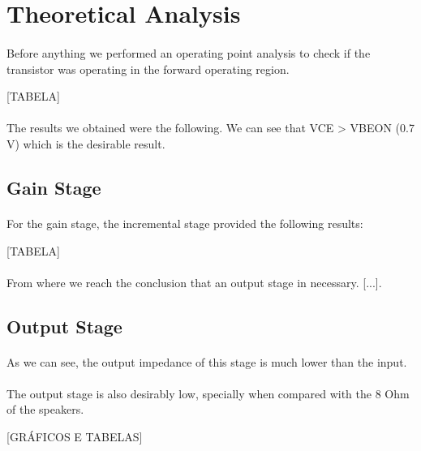 \section{Theoretical Analysis}
\label{sec:analysis}

\paragraph{} Before anything we performed an operating point analysis to check if the transistor was operating in the forward operating region.

[TABELA]

\paragraph{} The results we obtained were the following. We can see that VCE > VBEON (0.7 V) which is the desirable result.

\subsection{Gain Stage}

\paragraph{} For the gain stage, the incremental stage provided the following results:

[TABELA]

\paragraph{} From where we reach the conclusion that an output stage in necessary. [...].

\subsection{Output Stage}

\paragraph{} As we can see, the output impedance of this stage is much lower than the input.

\paragraph{} The output stage is also desirably low, specially when compared with the 8 Ohm of the speakers.

[GRÁFICOS E TABELAS] 

\clearpage
